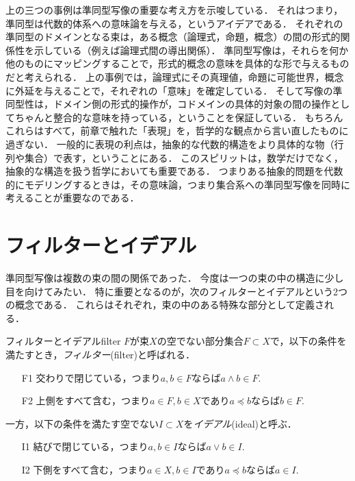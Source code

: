 \documentclass[11pt,a4paper, dvipdfmx]{jsarticle}
\begin{document}
上の三つの事例は準同型写像の重要な考え方を示唆している．
それはつまり，準同型は代数的体系への意味論を与える，というアイデアである．
それぞれの準同型のドメインとなる束は，ある概念（論理式，命題，概念）の間の形式的関係性を示している（例えば論理式間の導出関係）．
準同型写像は，それらを何か他のものにマッピングすることで，形式的概念の意味を具体的な形で与えるものだと考えられる．
上の事例では，論理式にその真理値，命題に可能世界，概念に外延を与えることで，それぞれの「意味」を確定している．
そして写像の準同型性は，ドメイン側の形式的操作が，コドメインの具体的対象の間の操作としてちゃんと整合的な意味を持っている，ということを保証している．
もちろんこれらはすべて，前章で触れた「表現」を，哲学的な観点から言い直したものに過ぎない．
一般的に表現の利点は，抽象的な代数的構造をより具体的な物（行列や集合）で表す，ということにある．
このスピリットは，数学だけでなく，抽象的な構造を扱う哲学においても重要である．
つまりある抽象的問題を代数的にモデリングするときは，その意味論，つまり集合系への準同型写像を同時に考えることが重要なのである．



\section{フィルターとイデアル}
準同型写像は複数の束の間の関係であった．
今度は一つの束の中の構造に少し目を向けてみたい．
特に重要となるのが，次のフィルターとイデアルという2つの概念である．
これらはそれぞれ，束の中のある特殊な部分として定義される．
\begin{dfn}{フィルターとイデアル}{filter}
$F$が束$X$の空でない部分集合$F \subset X$で，以下の条件を満たすとき，\emph{フィルター}(filter)と呼ばれる．
\begin{enumerate}
    \item[F1] 交わりで閉じている，つまり$a, b \in F$ならば$a \wedge b \in F$.
    \item[F2] 上側をすべて含む，つまり$a \in F, b \in X$であり$a \preceq b$ならば$b \in F$.
\end{enumerate}
一方，以下の条件を満たす空でない$I \subset X$を\emph{イデアル}(ideal)と呼ぶ．
\begin{enumerate}
    \item[I1] 結びで閉じている，つまり$a, b \in I$ならば$a \vee b \in I$.
    \item[I2] 下側をすべて含む，つまり$a \in X, b \in I$であり$a \preceq b$ならば$a \in I$.
\end{enumerate}
\end{dfn}
\end{document}
